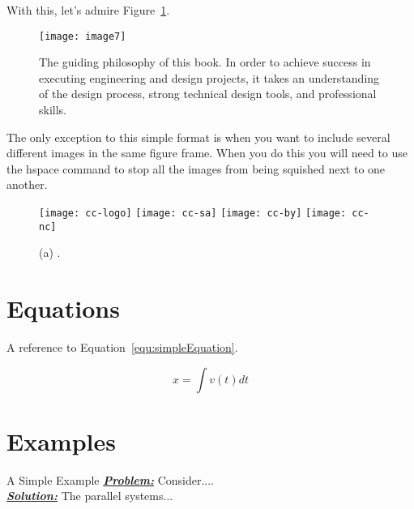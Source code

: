 With this, let's admire Figure~\ref{table:bookPhilosophy}. 





\begin{figure}[h]
\texttt{[image: image7]}

\caption{The guiding philosophy of this book. In order to
achieve success in executing engineering and design projects, it takes
an understanding of the design process, strong technical design tools,
and professional skills.}
\label{table:bookPhilosophy}
\end{figure}

The only exception to this simple format is when you want to include
several different images in the same figure frame.  When you do this
you will need to use the hspace command to stop all the images
from being squished next to one another.

\begin{figure}[h]
\hspace{1cm}
\texttt{[image: cc-logo]}
\hspace{1cm}
\texttt{[image: cc-sa]}
\hspace{1cm}
\texttt{[image: cc-by]}
\hspace{1cm}
\texttt{[image: cc-nc]}
\caption{(a) .}
\label{figure:howToCommonCollectiveLicense}
\end{figure}



\section{Equations}
\label{section:howToEquations}


A reference to Equation~\ref{equ:simpleEquation}.
\lipsum[12]


\begin{equation}
\label{equ:simpleEquation}
x = \int v(t) dt
\end{equation}

\lipsum[12]

\section{Examples}
\label{section:howToExamples}


\begin{example}{A Simple Example}
\label{example:aSimpleExample}
\emph{\textbf{\ul{Problem:}}} Consider.... \\	%
\noindent\emph{\textbf{\ul{Solution:}}} The parallel systems...
\end{example}

